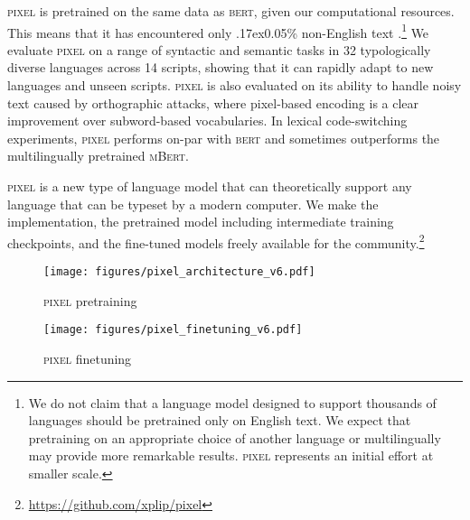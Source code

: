 \documentclass{article}
\newcommand{\model}{\textsc{pixel}\xspace}
\newcommand{\circa}{{\raise.17ex\hbox{}}}
\begin{document}
\model is pretrained on the same data as \textsc{bert}, given our computational resources. This means that it has encountered only \circa0.05\% non-English text \citep{blevins-zettlemoyer-2022-language}.\footnote{We do not claim that a language model designed to support thousands of languages should be pretrained only on English text. 
We expect that pretraining on an appropriate choice of another language or multilingually may provide more remarkable results. \model represents an initial effort at smaller scale.
}
We evaluate \model on a range of syntactic and semantic tasks in 32 typologically diverse languages across 14 scripts, showing that it can rapidly adapt to new languages and unseen scripts. 
\model is also evaluated on its ability to handle noisy text caused by orthographic attacks, where pixel-based encoding is a clear improvement over subword-based vocabularies. In lexical code-switching experiments, \model performs on-par with \textsc{bert} and sometimes outperforms the multilingually pretrained \textsc{mBert}.

\model is a new type of language model that can theoretically support any language that can be typeset by a modern computer. We make the implementation, the pretrained model including intermediate training checkpoints, and the fine-tuned models freely available for the community.\footnote{\url{https://github.com/xplip/pixel}}

\begin{figure*}[t]
    \centering
    \begin{subfigure}[b]{0.48\textwidth}\centering
    \texttt{[image: figures/pixel\_architecture\_v6.pdf]}
    \caption{\model pretraining}
    \end{subfigure}
    \quad
    \begin{subfigure}[b]{0.48\textwidth}\centering
    \texttt{[image: figures/pixel\_finetuning\_v6.pdf]}
    \caption{\model finetuning}
    \end{subfigure}
    \vspace{-2mm}
    \caption{Overview of \model's architecture. Following \cite{he-etal-2022-mae}, we use a masked autoencoder with a ViT architecture and a lightweight decoder for pretraining (left). At finetuning time (right), the decoder is replaced by a task-specific classification head that sits on top of the encoder.}
    \label{fig:architecture}
    \vspace{-4mm}
\end{figure*}
\end{document}
